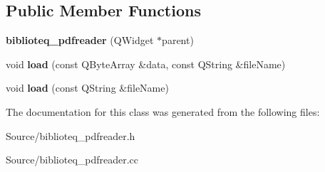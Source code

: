 \subsection*{Public Member Functions}
\begin{DoxyCompactItemize}
\item 
{\bfseries biblioteq\+\_\+pdfreader} (Q\+Widget $\ast$parent)\hypertarget{classbiblioteq__pdfreader_a12abb92404fc22a676e65e3215cadb43}{}\label{classbiblioteq__pdfreader_a12abb92404fc22a676e65e3215cadb43}

\item 
void {\bfseries load} (const Q\+Byte\+Array \&data, const Q\+String \&file\+Name)\hypertarget{classbiblioteq__pdfreader_aeb95f9e3b047af92d6106d16166247cd}{}\label{classbiblioteq__pdfreader_aeb95f9e3b047af92d6106d16166247cd}

\item 
void {\bfseries load} (const Q\+String \&file\+Name)\hypertarget{classbiblioteq__pdfreader_ae302c399ad979f274841c79111ad3ffb}{}\label{classbiblioteq__pdfreader_ae302c399ad979f274841c79111ad3ffb}

\end{DoxyCompactItemize}


The documentation for this class was generated from the following files\+:\begin{DoxyCompactItemize}
\item 
Source/biblioteq\+\_\+pdfreader.\+h\item 
Source/biblioteq\+\_\+pdfreader.\+cc\end{DoxyCompactItemize}
